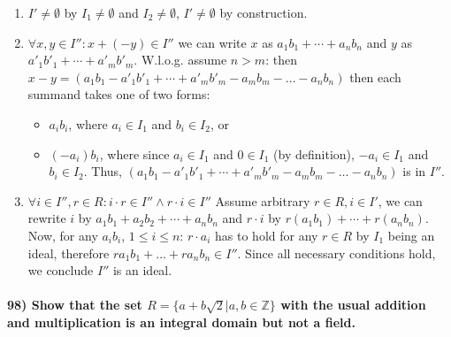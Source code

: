 \documentclass[
]{article}
\providecommand{\tightlist}{%
  \setlength{\itemsep}{0pt}\setlength{\parskip}{0pt}}
\begin{document}
\begin{enumerate}
\def\labelenumi{\arabic{enumi})}
\tightlist
\item
  \(I' \neq \emptyset\) by \(I_1 \neq \emptyset\) and
  \(I_2 \neq \emptyset\), \(I' \neq \emptyset\) by construction.
\item
  \(\forall x,y \in I'': x + (-y) \in I''\) we can write \(x\) as
  \(a_1 b_1+ \cdots + a_n b_n\) and \(y\) as
  \(a'_1b'_1 + \cdots + a'_m b'_m\). W.l.o.g. assume \(n > m\): then
  \(x-y = (a_1 b_1 - a'_1b'_1 + \cdots + a'_m b'_m - a_m b_m - \dots - a_n b_n)\)
  then each summand takes one of two forms:

  \begin{itemize}
  \tightlist
  \item
    \(a_ib_i\), where \(a_i \in I_1\) and \(b_i \in I_2\), or
  \item
    \((-a_i)b_i\), where since \(a_i \in I_1\) and \(0 \in I_1\) (by
    definition), \(-a_i \in I_1\) and \(b_i \in I_2\). Thus,
    \((a_1 b_1 - a'_1b'_1 + \cdots + a'_m b'_m - a_m b_m - \dots - a_n b_n)\)
    is in \(I''\).
  \end{itemize}
\item
  \(\forall i \in I'', r \in R: i \cdot r \in I'' \land r \cdot i \in I''\)
  Assume arbitrary \(r \in R, i \in I'\), we can rewrite \(i\) by
  \(a_1 b_1 + a_2 b_2 + \cdots + a_n b_n\) and \(r \cdot i\) by
  \(r(a_1 b_1) + \cdots + r(a_n b_n)\). Now, for any \(a_ib_i\),
  \(1 \leq i \leq n\): \(r \cdot a_i\) has to hold for any \(r \in R\)
  by \(I_1\) being an ideal, therefore
  \(r a_1 b_1 + \dots + ra_n b_n \in I''\). Since all necessary
  conditions hold, we conclude \(I''\) is an ideal.
\end{enumerate}

\hypertarget{show-that-the-set-r-absqrt2-ab-in-mathbbz-with-the-usual-addition-and-multiplication-is-an-integral-domain-but-not-a-field.}{%
\paragraph{\texorpdfstring{98) Show that the set
\(R = \{a+b\sqrt{2} | a,b \in \mathbb{Z}\}\) with the usual addition and
multiplication is an integral domain but not a
field.}{98) Show that the set R = \textbackslash\{a+b\textbackslash sqrt\{2\} \textbar{} a,b \textbackslash in \textbackslash mathbb\{Z\}\textbackslash\} with the usual addition and multiplication is an integral domain but not a field.}}\label{show-that-the-set-r-absqrt2-ab-in-mathbbz-with-the-usual-addition-and-multiplication-is-an-integral-domain-but-not-a-field.}}
\end{document}
